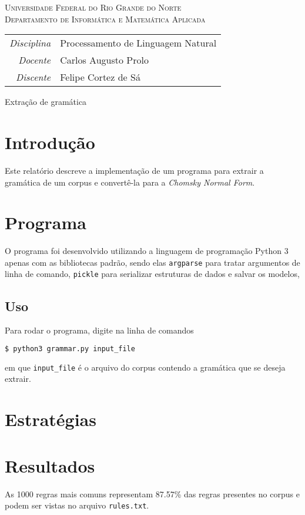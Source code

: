 \documentclass[12pt, a4paper]{article}
\newcommand{\code}[1]{{\lstinline{#1}}}
\begin{document}
\begin{center}
    \textsc{Universidade Federal do Rio Grande do Norte} \\
    \textsc{Departamento de Informática e Matemática Aplicada}
\end{center}

\bigskip

\begin{tabular}{@{}rl@{}}
    \emph{Disciplina} & Processamento de Linguagem Natural \\
    \emph{Docente}    & Carlos Augusto Prolo \\
    \emph{Discente}   & Felipe Cortez de Sá \\
\end{tabular}

\bigskip

\begin{center}
\large Extração de gramática
\end{center}

\section{Introdução}
Este relatório descreve a implementação de um programa para extrair a gramática
de um corpus e convertê-la para a \emph{Chomsky Normal Form}.

\section{Programa}
O programa foi desenvolvido utilizando a linguagem de programação Python 3
apenas com as bibliotecas padrão, sendo elas \code{argparse} para tratar
argumentos de linha de comando, \code{pickle} para serializar estruturas de
dados e salvar os modelos,

\subsection{Uso}
Para rodar o programa, digite na linha de comandos

\begin{lstlisting}[language=bash]
$ python3 grammar.py input_file
\end{lstlisting}

em que \code{input_file} é o arquivo do corpus contendo a gramática que se
deseja extrair.

\section{Estratégias}

\section{Resultados}
As 1000 regras mais comuns representam 87.57\% das regras presentes no corpus e
podem ser vistas no arquivo \code{rules.txt}.
\end{document}
